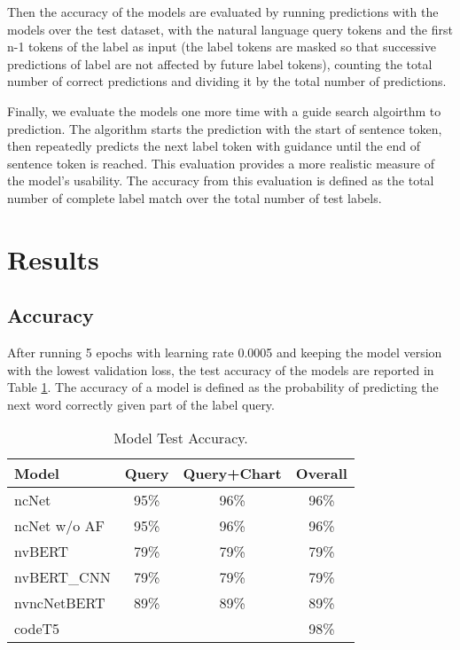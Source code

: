 \documentclass[
	a4paper, %
	10pt, %
	unnumberedsections, %
	twoside, %
]{t0003}
\begin{document}
Then the accuracy of the models are evaluated by running predictions with the models over the test dataset, with the natural language query tokens and the first n-1 tokens of the label as input (the label tokens are masked so that successive predictions of label are not affected by future label tokens), counting the total number of correct predictions and dividing it by the total number of predictions.

Finally, we evaluate the models one more time with a guide search algoirthm to prediction. The algorithm starts the prediction with the start of sentence token, then repeatedly predicts the next label token with guidance until the end of sentence token is reached. This evaluation provides a more realistic measure of the model's usability. The accuracy from this evaluation is defined as the total number of complete label match over the total number of test labels.

\section{Results}

\subsection{Accuracy}

After running 5 epochs with learning rate 0.0005 and keeping the model version with the lowest validation loss, the test accuracy of the models are reported in Table \ref{tab:accuracy}. The accuracy of a model is defined as the probability of predicting the next word correctly given part of the label query.

\begin{table} %
	\caption{Model Test Accuracy.}
	\centering
	\begin{tabular}{lccc}
		\toprule
		Model & Query & Query+Chart & Overall  \\
		\midrule
		ncNet & 95\% & 96\% & 96\% \\
		ncNet w/o AF & 95\% & 96\% & 96\%  \\
		\hline
		nvBERT & 79\% & 79\% & 79\% \\
		nvBERT\_CNN &  79\% & 79\% & 79\% \\
		\hline
		nvncNetBERT & 89\% & 89\% & 89\% \\
		\hline
		codeT5 & & & 98\% \\
		\bottomrule
	\end{tabular}
	\label{tab:accuracy}
\end{table}
\end{document}
